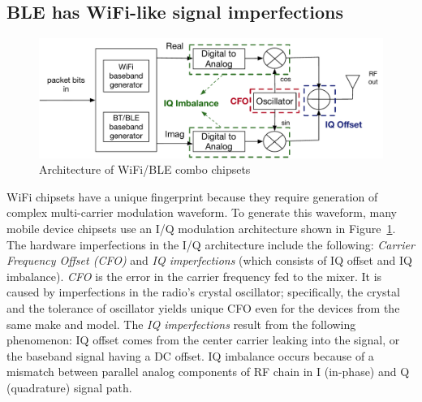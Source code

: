 \subsection{BLE has WiFi-like signal imperfections} %

\begin{figure}[t!]
    \centering
    \includegraphics[width = \linewidth]{plots/IQchain.pdf} 
    \caption{Architecture of WiFi/BLE combo chipsets}
    \label{fig:iq_arch}
\end{figure}


WiFi chipsets have a unique fingerprint because they require generation of
complex multi-carrier modulation waveform. To generate this waveform, many
mobile device chipsets use an I/Q modulation architecture shown in
Figure~\ref{fig:iq_arch}.
%
The hardware imperfections in the I/Q architecture include the following:
\emph{Carrier Frequency Offset (CFO)} and \emph{IQ imperfections} (which
consists of IQ offset and IQ imbalance). \emph{CFO} is the error in the carrier
frequency fed to the mixer. It is caused by imperfections in the radio's
crystal oscillator; specifically, the crystal and the tolerance of oscillator
yields unique CFO even for the devices from the same make and model.
%
The \emph{IQ imperfections} result from the following phenomenon: IQ offset
comes from the center carrier leaking into the signal, or the baseband signal having a
DC offset.%
IQ imbalance occurs because of a mismatch
between parallel analog components of RF chain in I (in-phase) and Q
(quadrature) signal path.%


